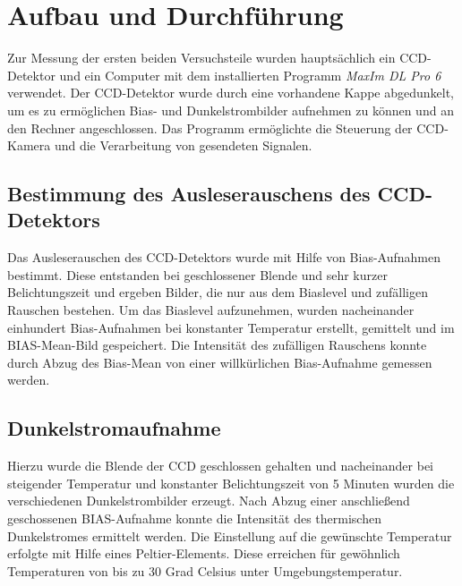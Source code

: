 \section{Aufbau und Durchführung} %
\label{sec:aufbau_und_durchf_hrung}

	Zur Messung der ersten beiden Versuchsteile wurden hauptsächlich ein CCD-Detektor und ein Computer mit dem installierten Programm \textit{MaxIm DL Pro 6} verwendet.
	Der CCD-Detektor wurde durch eine vorhandene Kappe abgedunkelt, um es zu ermöglichen Bias- und Dunkelstrombilder aufnehmen zu können und an den Rechner angeschlossen.
	Das Programm ermöglichte die Steuerung der CCD-Kamera und die Verarbeitung von gesendeten Signalen.

	\subsection{Bestimmung des Ausleserauschens des CCD-Detektors} %
	\label{sub:bestimmung_des_ausleserauschens_des_ccd_detektors}
	
		Das Ausleserauschen des CCD-Detektors wurde mit Hilfe von Bias-Aufnahmen bestimmt.
		Diese entstanden bei geschlossener Blende und sehr kurzer Belichtungszeit und ergeben Bilder, die nur aus dem Biaslevel und zufälligen Rauschen bestehen.
		Um das Biaslevel aufzunehmen, wurden nacheinander einhundert Bias-Aufnahmen bei konstanter Temperatur erstellt, gemittelt und im BIAS-Mean-Bild gespeichert. 
		Die Intensität des zufälligen Rauschens konnte durch Abzug des Bias-Mean von einer willkürlichen Bias-Aufnahme gemessen werden.



	\subsection{Dunkelstromaufnahme} %
	\label{sub:dunkelstromaufnahme}

		Hierzu wurde die Blende der CCD geschlossen gehalten und nacheinander bei steigender Temperatur und konstanter Belichtungszeit von 5 Minuten wurden die verschiedenen Dunkelstrombilder erzeugt. 
		Nach Abzug einer anschließend geschossenen BIAS-Aufnahme konnte die Intensität des thermischen Dunkelstromes ermittelt werden.
		Die Einstellung auf die gewünschte Temperatur erfolgte mit Hilfe eines Peltier-Elements.
		Diese erreichen für gewöhnlich Temperaturen von bis zu 30 Grad Celsius unter Umgebungstemperatur.


